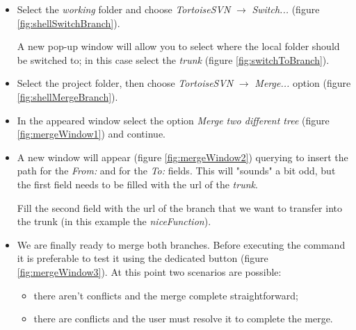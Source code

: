\begin{itemize}

    \item  Select the \textit{working} folder and choose \textit{TortoiseSVN} $\rightarrow$ \textit{Switch...} (figure \ref{fig:shellSwitchBranch}).
    
    A new pop-up window will allow you to select where the local folder should be switched to; in this case select the \textit{trunk} (figure \ref{fig:switchToBranch}). 

	
    \item Select the project folder, then choose \textit{TortoiseSVN} $\rightarrow$ \textit{Merge...} option (figure \ref{fig:shellMergeBranch}).
    
	
    \item In the appeared window select the option \textit{Merge two different tree} (figure \ref{fig:mergeWindow1}) and continue.
	
	
	\item A new window will appear (figure \ref{fig:mergeWindow2}) querying to insert the path for the \textit{From:} and for the \textit{To:} fields. This will "sounds" a bit odd, but the first field needs to be filled with the url of the \textit{trunk}.
	
	Fill the second field with the url of the branch that we want to transfer into the trunk (in this example the \textit{niceFunction}).
	
    
    \item We are finally ready to merge both branches. Before executing the command it is preferable to test it using the dedicated button (figure \ref{fig:mergeWindow3}). At this point two scenarios are possible:
    
    \begin{itemize}
    
    \item there aren't conflicts and the merge complete straightforward;
    
    \item there are conflicts and the user must resolve it to complete the merge.
    
    \end{itemize}

\end{itemize}




